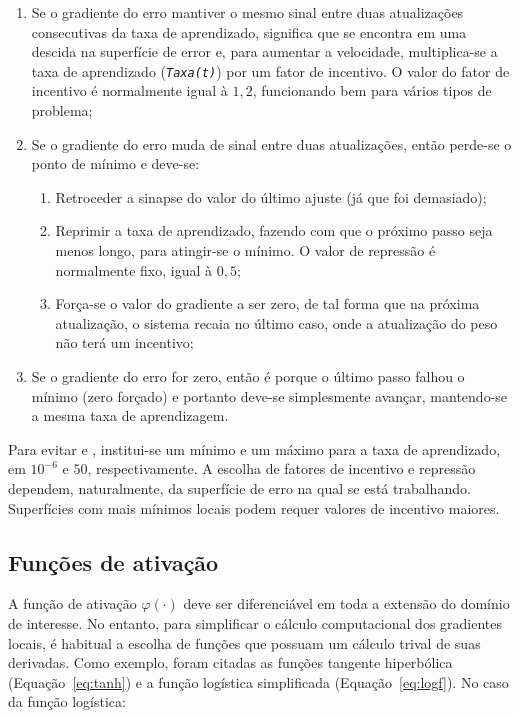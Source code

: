 \begin{enumerate}
\item Se o gradiente do erro mantiver o mesmo sinal entre duas
atualizações consecutivas da taxa de aprendizado, significa que se encontra em
uma descida na superfície de error e, para aumentar a velocidade,
multiplica-se a taxa de aprendizado (\texttt{\textit{Taxa(t)}}) por um fator
de incentivo. O valor do fator de incentivo é normalmente igual à $1,2$,
funcionando bem para vários tipos de problema;
\item Se o gradiente do erro muda de sinal entre duas atualizações, então
perde-se o ponto de mínimo e deve-se:
\begin{enumerate}
\item Retroceder a sinapse do valor do último ajuste (já que foi demasiado);
\item Reprimir a taxa de aprendizado, fazendo com que o próximo passo seja
menos longo, para atingir-se o mínimo. O valor de repressão é normalmente
fixo, igual à $0,5$;
\item Força-se o valor do gradiente a ser zero, de tal forma que na próxima
atualização, o sistema recaia no último caso, onde a atualização do peso não
terá um incentivo;
\end{enumerate}
\item Se o gradiente do erro for zero, então é porque o último passo falhou
o mínimo (zero forçado) e portanto deve-se simplesmente avançar, mantendo-se a
mesma taxa de aprendizagem.
\end{enumerate}

Para evitar  e , institui-se um mínimo e um
máximo para a taxa de aprendizado, em $10^{-6}$ e $50$, respectivamente. A
escolha de fatores de incentivo e repressão dependem, naturalmente, da
superfície de erro na qual se está trabalhando. Superfícies com mais mínimos
locais podem requer valores de incentivo maiores.

\subsection{Funções de ativação} 

A função de ativação $\varphi(\cdot)$ deve ser diferenciável em toda a
extensão do domínio de interesse. No entanto, para simplificar o cálculo
computacional dos gradientes locais, é habitual a escolha de funções que
possuam um cálculo trival de suas derivadas. Como exemplo, foram citadas as
funções tangente hiperbólica (Equação~\ref{eq:tanh}) e a função logística
simplificada (Equação~\ref{eq:logf}). No caso da função logística:

